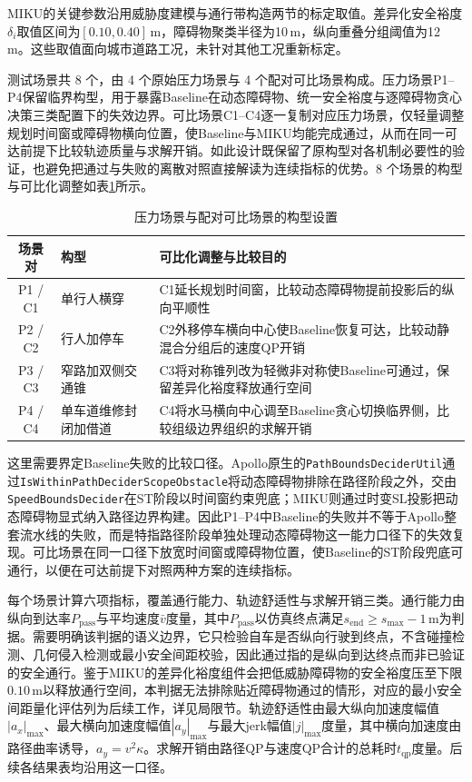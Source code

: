 \documentclass[a4paper,11pt]{ctexart}
\theoremstyle{definition}
\begin{document}
MIKU的关键参数沿用威胁度建模与通行带构造两节的标定取值。差异化安全裕度$\delta_i$取值区间为$[0.10, 0.40]$\,m，障碍物聚类半径为10\,m，纵向重叠分组阈值为12\,m。这些取值面向城市道路工况，未针对其他工况重新标定。

测试场景共 8 个，由 4 个原始压力场景与 4 个配对可比场景构成。压力场景P1--P4保留临界构型，用于暴露Baseline在动态障碍物、统一安全裕度与逐障碍物贪心决策三类配置下的失效边界。可比场景C1--C4逐一复制对应压力场景，仅轻量调整规划时间窗或障碍物横向位置，使Baseline与MIKU均能完成通过，从而在同一可达前提下比较轨迹质量与求解开销。如此设计既保留了原构型对各机制必要性的验证，也避免把通过与失败的离散对照直接解读为连续指标的优势。8 个场景的构型与可比化调整如表\ref{tab:exp_scenarios}所示。

\begin{table}[htbp]
\centering
\caption{压力场景与配对可比场景的构型设置}
\label{tab:exp_scenarios}
\small
\begin{tabular}{c l p{7.4cm}}
\toprule
\textbf{场景对} & \textbf{构型} & \textbf{可比化调整与比较目的} \\
\midrule
P1 / C1 & 单行人横穿 & C1延长规划时间窗，比较动态障碍物提前投影后的纵向平顺性 \\
P2 / C2 & 行人加停车 & C2外移停车横向中心使Baseline恢复可达，比较动静混合分组后的速度QP开销 \\
P3 / C3 & 窄路加双侧交通锥 & C3将对称锥列改为轻微非对称使Baseline可通过，保留差异化裕度释放通行空间 \\
P4 / C4 & 单车道维修封闭加借道 & C4将水马横向中心调至Baseline贪心切换临界侧，比较组级边界组织的求解开销 \\
\bottomrule
\end{tabular}
\end{table}

这里需要界定Baseline失败的比较口径。Apollo原生的\texttt{PathBoundsDeciderUtil}通过\texttt{IsWithinPathDeciderScopeObstacle}将动态障碍物排除在路径阶段之外，交由\texttt{SpeedBoundsDecider}在ST阶段以时间窗约束兜底；MIKU则通过时变SL投影把动态障碍物显式纳入路径边界构建。因此P1--P4中Baseline的失败并不等于Apollo整套流水线的失败，而是特指路径阶段单独处理动态障碍物这一能力口径下的失效复现。可比场景在同一口径下放宽时间窗或障碍物位置，使Baseline的ST阶段兜底可通行，以便在可达前提下对照两种方案的连续指标。

每个场景计算六项指标，覆盖通行能力、轨迹舒适性与求解开销三类。通行能力由纵向到达率$P_{\mathrm{pass}}$与平均速度$\bar v$度量，其中$P_{\mathrm{pass}}$以仿真终点满足$s_{\mathrm{end}} \geq s_{\max} - 1$\,m为判据。需要明确该判据的语义边界，它只检验自车是否纵向行驶到终点，不含碰撞检测、几何侵入检测或最小安全间距校验，因此通过指的是纵向到达终点而非已验证的安全通行。鉴于MIKU的差异化裕度组件会把低威胁障碍物的安全裕度压至下限$0.10$\,m以释放通行空间，本判据无法排除贴近障碍物通过的情形，对应的最小安全间距量化评估列为后续工作，详见局限节。轨迹舒适性由最大纵向加速度幅值$|a_x|_{\max}$、最大横向加速度幅值$|a_y|_{\max}$与最大jerk幅值$|j|_{\max}$度量，其中横向加速度由路径曲率诱导，$a_y = v^2 \kappa$。求解开销由路径QP与速度QP合计的总耗时$t_{\mathrm{qp}}$度量。后续各结果表均沿用这一口径。
\end{document}
